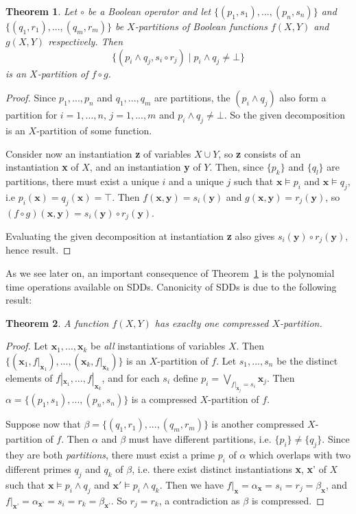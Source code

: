 \documentclass[11pt]{article}
\newtheorem{theorem}{Theorem}[section]
\begin{document}
\begin{theorem}
\label{theorem_apply}
Let $\circ$ be a Boolean operator and let $\{(p_1, s_1),...,(p_n, s_n)\}$ and $\{(q_1, r_1),...,(q_m, r_m)\}$  be $X$-partitions of Boolean functions $f(X, Y)$ and $g(X, Y)$ respectively. Then $$\{(p_i \land q_j, s_i \circ r_j) \mid  p_i \land q_j  \neq \bot \}$$ is an $X$-partition of $f \circ g$.
\end{theorem}
\begin{proof}
 Since $p_1, ..., p_n$ and $q_1, ..., q_m$ are partitions, the $(p_i \land q_j)$ also form a partition for $i = 1, ..., n$, $j = 1, ..., m$ and $p_i \land q_j \neq \bot$. So the given decomposition is an $X$-partition of some function.

Consider now an instantiation \textbf{z} of variables $X\cup Y$, so \textbf{z} consists of an instantiation \textbf{x} of $X$, and an instantiation \textbf{y} of $Y$. 
Then, since $\{p_k\}$ and $\{q_l\}$ are partitions, there must exist a unique $i$ and a unique $j$ such that $\textbf{x} \models p_i$ and $\textbf{x} \models q_j$, i.e $p_i(\textbf{x}) = q_j(\textbf{x}) = \top$. Then $f(\textbf{x}, \textbf{y}) = s_i(\textbf{y})$ and $g(\textbf{x}, \textbf{y}) = r_j(\textbf{y})$, so $(f\circ g)(\textbf{x}, \textbf{y}) = s_i(\textbf{y})\circ r_j(\textbf{y}).$

Evaluating the given decomposition at instantiation \textbf{z} also gives $s_i(\textbf{y}) \circ r_j(\textbf{y})$, hence result. 
\end{proof}

As we see later on, an important consequence of Theorem~\ref{theorem_apply} is the polynomial time operations available on SDDs. Canonicity of SDDs is due to the following result:

\begin{theorem}
\label{unique_compressed}
A function $f(X, Y)$ has exaclty one compressed $X$-partition.
\end{theorem}
\begin{proof}
Let $\textbf{x}_1, ..., \textbf{x}_k$ be \textit{all} instantiations of variables $X$. Then $\{(\textbf{x}_1, f|_{\textbf{x}_1}), ..., (\textbf{x}_k, f|_{\textbf{x}_k})\}$ is an $X$-partition of $f$. Let $s_1, ..., s_n$ be the distinct elements of $f|_{\textbf{x}_1}, ..., f|_{\textbf{x}_k}$, and for each $s_i$ define $p_i = \bigvee_{f|_{\textbf{x}_j} = s_i} \textbf{x}_j$.
Then $\alpha = \{(p_1, s_1), ..., (p_n, s_n)\}$ is a compressed $X$-partition of $f$. 

Suppose now that $\beta = \{(q_1, r_1), ..., (q_m, r_m)\}$ is another compressed $X$-partition of $f$. Then $\alpha$ and $\beta$ must have different partitions, i.e. $\{p_i\} \neq \{q_j\}$. Since they are both \textit{partitions}, there must exist a prime $p_i$ of $\alpha$ which overlaps with two different primes $q_j$ and $q_k$ of $\beta$, i.e. there exist distinct instantiations \textbf{x}, \textbf{x}' of $X$ such that $\textbf{x} \models p_i \land q_j$ and $\textbf{x}' \models p_i \land q_k$. Then we have $f|_\textbf{x} = \alpha_\textbf{x} = s_i = r_j = \beta_\textbf{x}$, and $f|_\textbf{x'} = \alpha_\textbf{x'} = s_i = r_k = \beta_\textbf{x'}$. So $r_j = r_k$, a contradiction as $\beta$ is compressed.  
\end{proof}
\end{document}
